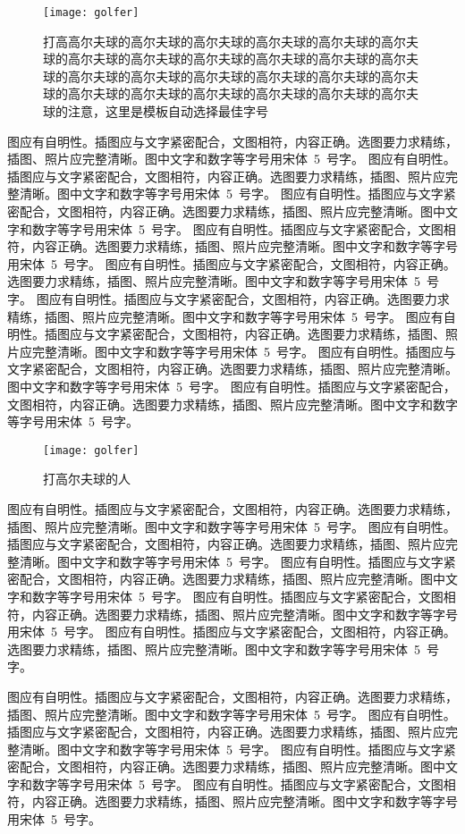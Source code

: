 \begin{figure}[h]
\centering
\texttt{[image: golfer]}
\caption{打高高尔夫球的高尔夫球的高尔夫球的高尔夫球的高尔夫球的高尔夫球的高尔夫球的高尔夫球的高尔夫球的高尔夫球的高尔夫球的高尔夫球的高尔夫球的高尔夫球的高尔夫球的高尔夫球的高尔夫球的高尔夫球的高尔夫球的高尔夫球的高尔夫球的高尔夫球的高尔夫球的高尔夫球的注意，这里是模板自动选择最佳字号}
\end{figure}

图应有自明性。插图应与文字紧密配合，文图相符，内容正确。选图要力求精练，插图、照片应完整清晰。图中文字和数字等字号用宋体~5~号字。
图应有自明性。插图应与文字紧密配合，文图相符，内容正确。选图要力求精练，插图、照片应完整清晰。图中文字和数字等字号用宋体~5~号字。
图应有自明性。插图应与文字紧密配合，文图相符，内容正确。选图要力求精练，插图、照片应完整清晰。图中文字和数字等字号用宋体~5~号字。
图应有自明性。插图应与文字紧密配合，文图相符，内容正确。选图要力求精练，插图、照片应完整清晰。图中文字和数字等字号用宋体~5~号字。
图应有自明性。插图应与文字紧密配合，文图相符，内容正确。选图要力求精练，插图、照片应完整清晰。图中文字和数字等字号用宋体~5~号字。
图应有自明性。插图应与文字紧密配合，文图相符，内容正确。选图要力求精练，插图、照片应完整清晰。图中文字和数字等字号用宋体~5~号字。
图应有自明性。插图应与文字紧密配合，文图相符，内容正确。选图要力求精练，插图、照片应完整清晰。图中文字和数字等字号用宋体~5~号字。
图应有自明性。插图应与文字紧密配合，文图相符，内容正确。选图要力求精练，插图、照片应完整清晰。图中文字和数字等字号用宋体~5~号字。
图应有自明性。插图应与文字紧密配合，文图相符，内容正确。选图要力求精练，插图、照片应完整清晰。图中文字和数字等字号用宋体~5~号字。

\begin{figure}[htpb]
\centering
\texttt{[image: golfer]}
\caption{打高尔夫球的人}
\end{figure}

图应有自明性。插图应与文字紧密配合，文图相符，内容正确。选图要力求精练，插图、照片应完整清晰。图中文字和数字等字号用宋体~5~号字。
图应有自明性。插图应与文字紧密配合，文图相符，内容正确。选图要力求精练，插图、照片应完整清晰。图中文字和数字等字号用宋体~5~号字。
图应有自明性。插图应与文字紧密配合，文图相符，内容正确。选图要力求精练，插图、照片应完整清晰。图中文字和数字等字号用宋体~5~号字。
图应有自明性。插图应与文字紧密配合，文图相符，内容正确。选图要力求精练，插图、照片应完整清晰。图中文字和数字等字号用宋体~5~号字。
图应有自明性。插图应与文字紧密配合，文图相符，内容正确。选图要力求精练，插图、照片应完整清晰。图中文字和数字等字号用宋体~5~号字。

图应有自明性。插图应与文字紧密配合，文图相符，内容正确。选图要力求精练，插图、照片应完整清晰。图中文字和数字等字号用宋体~5~号字。
图应有自明性。插图应与文字紧密配合，文图相符，内容正确。选图要力求精练，插图、照片应完整清晰。图中文字和数字等字号用宋体~5~号字。
图应有自明性。插图应与文字紧密配合，文图相符，内容正确。选图要力求精练，插图、照片应完整清晰。图中文字和数字等字号用宋体~5~号字。
图应有自明性。插图应与文字紧密配合，文图相符，内容正确。选图要力求精练，插图、照片应完整清晰。图中文字和数字等字号用宋体~5~号字。
